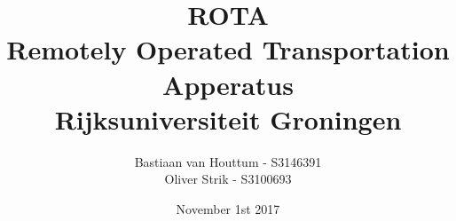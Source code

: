\documentclass[11pt, a4paper]{article}
\begin{document}
\begin{titlepage}
  \centering
  \title{ROTA \\\large Remotely Operated Transportation Apperatus \\\small \textbf{Rijksuniversiteit Groningen}}
  \author{Bastiaan van Houttum - S3146391 \\ Oliver Strik - S3100693}
  \date{November 1st 2017}
  \maketitle
\end{titlepage}

\pagebreak\tableofcontents
\pagebreak

\pagebreak
\pagebreak
\pagebreak
\pagebreak

\end{document}
